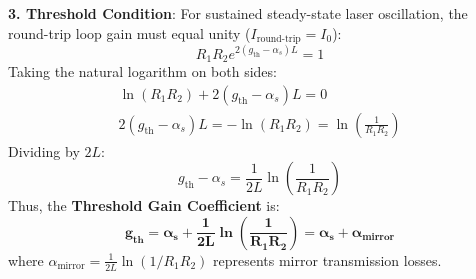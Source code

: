 \begin{theorysol}
\textbf{3. Threshold Condition}:
For sustained steady-state laser oscillation, the round-trip loop gain must equal unity ($I_{\text{round-trip}} = I_0$):
\begin{equation}
R_1 R_2 e^{2(g_{\text{th}} - \alpha_s)L} = 1
\end{equation}
Taking the natural logarithm on both sides:
\begin{align}
\ln(R_1 R_2) + 2(g_{\text{th}} - \alpha_s)L = 0 \\
2(g_{\text{th}} - \alpha_s)L = -\ln(R_1 R_2) = \ln\left(\frac{1}{R_1 R_2}\right)
\end{align}
Dividing by $2L$:
\begin{equation}
g_{\text{th}} - \alpha_s = \frac{1}{2L}\ln\left(\frac{1}{R_1 R_2}\right)
\end{equation}
Thus, the \textbf{Threshold Gain Coefficient} is:
\begin{equation}
\mathbf{g_{\text{th}} = \alpha_s + \frac{1}{2L}\ln\left(\frac{1}{R_1 R_2}\right) = \alpha_s + \alpha_{\text{mirror}}}
\end{equation}
where $\alpha_{\text{mirror}} = \frac{1}{2L}\ln(1/R_1 R_2)$ represents mirror transmission losses.
\end{theorysol}
\vspace{4mm}

